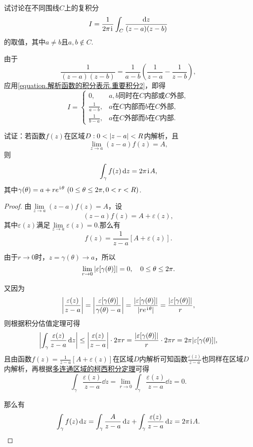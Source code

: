 \begin{example}
试讨论在不同围线\(C\)上的复积分\[
I = \frac{1}{2\pi\kern1pt\mathrm{i}\kern1pt} \int_C \frac{\dd{z}}{(z-a)(z-b)}
\]的取值，其中\(a \neq b\)且\(a,b \notin C\).
\begin{solution}
由于\[
\frac{1}{(z-a)(z-b)}
= \frac{1}{a-b} \left(\frac{1}{z-a}-\frac{1}{z-b}\right),
\]应用\cref{equation.解析函数的积分表示.重要积分2}，即得\[
I = \left\{\begin{array}{cl}
0, & \text{\(a,b\)同时在\(C\)内部或\(C\)外部}, \\
\frac{1}{a-b}, & \text{\(a\)在\(C\)内部而\(b\)在\(C\)外部}, \\
\frac{1}{b-a}, & \text{\(a\)在\(C\)外部而\(b\)在\(C\)内部}.
\end{array}\right.
\]
\end{solution}
\end{example}

\begin{example}%
试证：若函数\(f(z)\)在区域\(D: 0<\abs{z-a}<R\)内解析，且\[
\lim\limits_{z \to a}(z-a)f(z)=A,
\]则\[
\int_{\gamma} f(z) \dd{z} = 2\pi\kern1pt\mathrm{i}\kern1pt A,
\]其中\(\gamma(\theta) = a+re^{\kern1pt\mathrm{i}\kern1pt\theta}\ (0 \leq \theta \leq 2\pi, 0 < r < R)\).
\begin{proof}
由\(\lim\limits_{z \to a}(z-a)f(z) = A\)，设\[
(z-a)f(z) = A + \varepsilon(z),
\]其中\(\varepsilon(z)\)满足\(\lim\limits_{z \to a} \varepsilon(z) = 0\).那么有\[
f(z) = \frac{1}{z-a}[A+\varepsilon(z)].
\]

由于\(r\to0\)时，\(z=\gamma(\theta) \to a\)，所以\[
\lim\limits_{r\to0} \abs{\varepsilon[\gamma(\theta)]} = 0,
\quad 0 \leq \theta \leq 2\pi.
\]

又因为\[
\abs{\frac{\varepsilon(z)}{z-a}}
= \abs{\frac{\varepsilon[\gamma(\theta)]}{\gamma(\theta)-a}}
= \frac{\abs{\varepsilon[\gamma(\theta)]}}{\abs{re^{\kern1pt\mathrm{i}\kern1pt\theta}}}
= \frac{\abs{\varepsilon[\gamma(\theta)]}}{r},
\]则根据积分估值定理可得\[
\abs{\int_{\gamma} \frac{\varepsilon(z)}{z-a} \dd{z}}
\leq \abs{\frac{\varepsilon(z)}{z-a}} \cdot 2\pi r
= \frac{\abs{\varepsilon[\gamma(\theta)]}}{r} \cdot 2\pi r
= 2\pi \abs{\varepsilon[\gamma(\theta)]},
\]且由函数\(f(z) = \frac{1}{z-a}[A+\varepsilon(z)]\)在区域\(D\)内解析可知函数\(\frac{\varepsilon(z)}{z-a}\)也同样在区域\(D\)内解析，再根据\hyperref[theorem:解析函数的积分表示.多连通区域的柯西积分定理]{多连通区域的柯西积分定理}可得\[
\int_{\gamma} \frac{\varepsilon(z)}{z-a} \dd{z}
= \lim\limits_{r\to0} \int_{\gamma} \frac{\varepsilon(z)}{z-a} \dd{z}
= 0.
\]

那么有
\[
\int_{\gamma} f(z) \dd{z}
= \int_{\gamma} \frac{A}{z-a} \dd{z}
+ \int_{\gamma} \frac{\varepsilon(z)}{z-a} \dd{z}
= 2\pi\kern1pt\mathrm{i}\kern1pt A.
\qedhere
\]
\end{proof}
\end{example}

